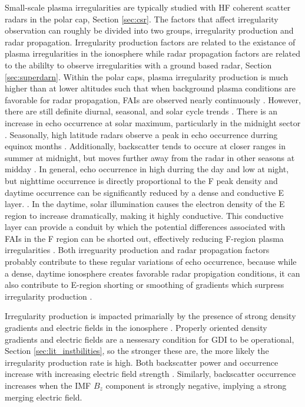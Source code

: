 Small-scale plasma irregularities are typically studied with HF coherent scatter radars in the polar cap, Section \ref{sec:csr}.  The factors that affect irregularity observation can roughly be divided into two groups, irregularity production and radar propagation.  Irregularity production factors are related to the existance of plasma irregularities in the ionosphere while radar propagation factors are related to the abililty to observe irregularities with a ground based radar, Section \ref{sec:superdarn}.  Within the polar caps, plasma irregularity production is much higher than at lower altitudes such that when background plasma conditions are favorable for radar propagation, FAIs are observed nearly continuously \citep{Bristow2011}.  However, there are still definite diurnal, seasonal, and solar cycle trends \citep{Kane2012}.  There is an increase in echo occurrence at solar maximum, particularly in the midnight sector \citep{Milan1997,Koustov2004}.  Seasonally, high latitude radars observe a peak in echo occurrence durring equinox months \citep{Koustov2004}.  Additionally, backscatter tends to occure at closer ranges in summer at midnight, but moves further away from the radar in other seasons at midday \citep{Milan1997}.  In general, echo occurrence in high durring the day and low at night, but nighttime occurrence is directly proportional to the F peak density and daytime occurrence can be significantly reduced by a dense and conductive E layer. \citep{Koustov2004,Kane2012,Vickrey1982}.  In the daytime, solar illumination causes the electron density of the E region to increase dramatically, making it highly conductive.  This conductive layer can provide a conduit by which the potential differences associated with FAIs in the F region can be shorted out, effectively reducing F-region plasma irregularities \citep{Vickrey1982}.  Both irreguarity production and radar propagation factors probably contribute to these regular variations of echo occurrence, because while a dense, daytime ionosphere creates favorable radar propigation conditions, it can also contribute to E-region shorting or smoothing of gradients which surpress irregularity production \citep{Koustov2004}.  

Irregularity production is impacted primarially by the presence of strong density gradients and electric fields in the ionosphere \citep{Koustov2004}.  Properly oriented density gradients and electric fields are a nessesary condition for GDI to be operational, Section \ref{sec:lit_instbilities}, so the stronger these are, the more likely the irregularity production rate is high.  Both backscatter power and occurrence increase with increasing electric field strength \citep{Ballatore2001,Danskin2002,Makarevich2014}.  Similarly, backscatter occurrence increases when the IMF \(B_z\) component is strongly negative, implying a strong merging electric field.

